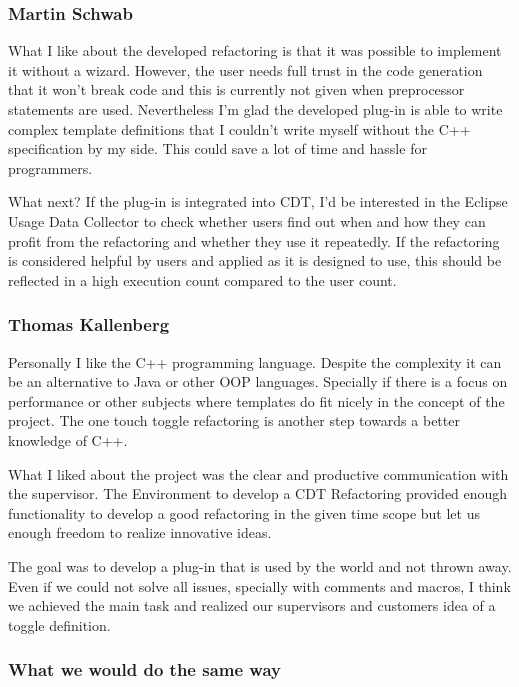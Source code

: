\subsubsection{Martin Schwab}

What I like about the developed refactoring is that it was possible to
implement 
it without a wizard. However, the user needs full trust in the code generation 
that it won't break code and this is currently not given when preprocessor 
statements are used. Nevertheless I'm glad the developed plug-in is able to
write 
complex template definitions that I couldn't write myself without the C++ 
specification by my side. This could save a lot of time and hassle for 
programmers.

What next? If the plug-in is integrated into CDT, I'd be interested in the 
Eclipse Usage Data Collector \cite{usageData} to check whether users find out 
when and how they can profit from the refactoring and whether they use it 
repeatedly. If the refactoring is considered helpful by users and applied as it 
is designed to use, this should be reflected in a high execution count compared 
to the user count.

\subsubsection{Thomas Kallenberg}

Personally I like the C++ programming language. Despite the complexity it can
be an alternative to Java or other OOP languages. Specially if there is a focus
on performance or other subjects where templates do fit nicely in the concept
of the project.
The one touch toggle refactoring is another step towards a better knowledge of
C++.

What I liked about the project was the clear and productive communication with
the supervisor. The Environment to develop a CDT Refactoring provided enough
functionality to develop a good refactoring in the given time scope but let us
enough freedom to realize innovative ideas.

The goal was to develop a plug-in that is used by the world and not thrown away.
Even if we could not solve all issues, specially with comments and macros, I
think we achieved the main task and realized our supervisors and customers 
idea of a toggle definition.

\subsubsection{What we would do the same way}

